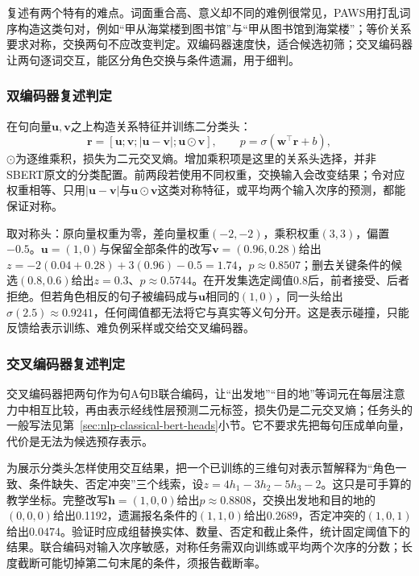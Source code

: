 复述有两个特有的难点。词面重合高、意义却不同的难例很常见，PAWS用打乱词序构造这类句对，例如“甲从海棠楼到图书馆”与“甲从图书馆到海棠楼”\cite{nlp-intro-zhang2019paws}；等价关系要求对称，交换两句不应改变判定。双编码器速度快，适合候选初筛；交叉编码器让两句逐词交互，能区分角色交换与条件遗漏，用于细判。

\subsubsection{双编码器复述判定}
\label{sec:nlp-classification-paraphrase-bi}

在句向量$\bm u,\bm v$之上构造关系特征并训练二分类头：
\[
  \bm r=[\bm u;\bm v;|\bm u-\bm v|;\bm u\odot\bm v],
  \qquad p=\sigma(\bm w^\top\bm r+b),
\]
$\odot$为逐维乘积，损失为二元交叉熵。增加乘积项是这里的关系头选择，并非SBERT原文的分类配置。前两段若使用不同权重，交换输入会改变结果；令对应权重相等、只用$|\bm u-\bm v|$与$\bm u\odot\bm v$这类对称特征，或平均两个输入次序的预测，都能保证对称。

取对称头：原向量权重为零，差向量权重$(-2,-2)$，乘积权重$(3,3)$，偏置$-0.5$。$\bm u=(1,0)$与保留全部条件的改写$\bm v=(0.96,0.28)$给出$z=-2(0.04+0.28)+3(0.96)-0.5=1.74$，$p\approx0.8507$；删去关键条件的候选$(0.8,0.6)$给出$z=0.3$、$p\approx0.5744$。在开发集选定阈值0.8后，前者接受、后者拒绝。但若角色相反的句子被编码成与$\bm u$相同的$(1,0)$，同一头给出$\sigma(2.5)\approx0.9241$，任何阈值都无法将它与真实等义句分开。这是表示碰撞，只能反馈给表示训练、难负例采样或交给交叉编码器。

\subsubsection{交叉编码器复述判定}
\label{sec:nlp-classification-paraphrase-cross}

交叉编码器把两句作为\code{[CLS]}句A\code{[SEP]}句B\code{[SEP]}联合编码，让“出发地”“目的地”等词元在每层注意力中相互比较，再由\code{[CLS]}表示经线性层预测二元标签，损失仍是二元交叉熵；任务头的一般写法见第~\ref{sec:nlp-classical-bert-heads}小节。它不要求先把每句压成单向量，代价是无法为候选预存表示。

为展示分类头怎样使用交互结果，把一个已训练的三维句对表示暂解释为“角色一致、条件缺失、否定冲突”三个线索，设$z=4h_1-3h_2-5h_3-2$。这只是可手算的教学坐标。完整改写$\bm h=(1,0,0)$给出$p\approx0.8808$，交换出发地和目的地的$(0,0,0)$给出0.1192，遗漏报名条件的$(1,1,0)$给出0.2689，否定冲突的$(1,0,1)$给出0.0474。验证时应成组替换实体、数量、否定和截止条件，统计固定阈值下的结果。联合编码对输入次序敏感，对称任务需双向训练或平均两个次序的分数；长度截断可能切掉第二句末尾的条件，须报告截断率。

